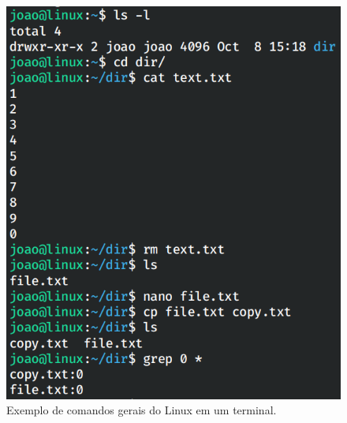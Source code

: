 \documentclass[
	12pt,				%
	oneside,   	        %
	a4paper,			%
	english,			%
	french,				%
	spanish,			%
	brazil,				%
	]{pacotes/abntex2}
\begin{document}
\begin{figure}[H]
  \centering
  \includegraphics[scale=0.5]{figuras/commons.png}
  \caption{Exemplo de comandos gerais do Linux em um terminal.}
  \label{fig:comandos}
\end{figure}
\end{document}
